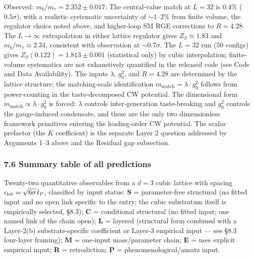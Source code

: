\documentclass[
]{article}
\begin{document}
Observed: \(m_b/m_\tau = 2.352 \pm 0.017\). The central-value match at
\(L=32\) is \(0.4\%\) (\(0.5\sigma\)), with a realistic systematic
uncertainty of \(\sim 1\)--\(2\%\) from finite volume, the regulator
choice noted above, and higher-loop SM RGE corrections to \(R = 4.28\).
The \(L \to \infty\) extrapolation in either lattice regulator gives
\(Z_S \approx 1.83\) and \(m_b/m_\tau \approx 2.34\), consistent with
observation at \(\sim 0.7\sigma\). The \(L = 32\) run (50 configs) gives
\(Z_S(0.122) = 1.813 \pm 0.001\) (statistical only) by cubic
interpolation; finite-volume systematics are not exhaustively quantified
in the released code (see Code and Data Availability). The inputs
\(\lambda\), \(g_0^2\), and \(R = 4.28\) are determined by the lattice
structure; the matching-scale identification
\(m_{\text{match}} = \lambda \cdot g_0^2\) follows from power-counting
in the taste-decomposed CW potential. The dimensional form
\(m_{\text{match}} \propto \lambda \cdot g_0^2\) is forced: \(\lambda\)
controls inter-generation taste-breaking and \(g_0^2\) controls the
gauge-induced condensate, and these are the only two dimensionless
framework primitives entering the leading-order CW potential. The scalar
prefactor (the \(K\) coefficient) is the separate Layer 2 question
addressed by Arguments 1--3 above and the Residual gap subsection.

\hypertarget{summary-table-of-all-predictions}{%
\subsubsection{7.6 Summary table of all
predictions}\label{summary-table-of-all-predictions}}

Twenty-two quantitative observables from a \(d = 3\) cubic lattice with
spacing \(\epsilon_{\rm lat} = \sqrt{6\sigma}\,l_P\), classified by
input status: \textbf{S} = parameter-free structural (no fitted input
and no open link specific to the entry; the cubic substratum itself is
empirically selected, §8.3); \textbf{C} = conditional structural (no
fitted input; one named link of the chain open); \textbf{L} = layered
(structural form combined with a Layer-2(b) substrate-specific
coefficient or Layer-3 empirical input --- see §8.3 four-layer framing);
\textbf{M} = one-input mass/parameter chain; \textbf{E} = uses explicit
empirical input; \textbf{R} = retrodiction; \textbf{P} =
phenomenological/ansatz input.
\end{document}
